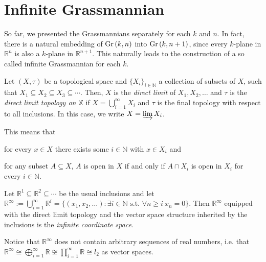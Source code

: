 \section{Infinite Grassmannian}
So far, we presented the Grassmannians separately for each $k$ and $n$. In fact, there is a natural embedding of $\Gr{k}{n}$ into $\Gr{k}{n+1}$, since every $k$-plane in $\mathbb{R}^n$ is also a $k$-plane in $\mathbb{R}^{n+1}$. This naturally leads to the construction of a so called infinite Grassmannian for each $k$.

\begin{definition} Let $(X,\tau)$ be a topological space and $\{X_i\}_{i\in\mathbb{N}}$ a collection of subsets of $X$, such that $X_1\subseteq X_2\subseteq X_3\subseteq\cdots$. Then, $X$ is the \emph{direct limit} of $X_1,X_2,\ldots$ and $\tau$ is the \emph{direct limit topology on $\mathbb{X}$} if $X=\bigcup_{i=1}^{\infty}X_i$ and $\tau$ is the final topology with respect to all inclusions. In this case, we write $X=\varinjlim X_i$.
\end{definition}
\begin{remark} This means that
\begin{b_item}
\item for every $x\in X$ there exists some $i\in\mathbb{N}$ with $x\in X_i$ and
\item for any subset $A\subseteq X$, $A$ is open in $X$ if and only if $A\cap X_i$ is open in $X_i$ for every $i\in\mathbb{N}$.
\end{b_item}
\end{remark}

\begin{definition} Let $\mathbb{R}^1\subseteq\mathbb{R}^2\subseteq\cdots$ be the usual inclusions and let $\mathbb{R}^{\infty}:=\bigcup_{i=1}^{\infty}\mathbb{R}^i=\big\{(x_1,x_2,\ldots):\exists i\in\mathbb{N}\text{ s.t. }\forall n\geq i\ x_n=0\big\}$. Then $\mathbb{R}^{\infty}$ equipped with the direct limit topology and the vector space structure inherited by the inclusions is the \emph{infinite coordinate space}.
\end{definition}
\begin{remark} Notice that $\mathbb{R}^{\infty}$ does not contain arbitrary sequences of real numbers, i.e. that $\mathbb{R}^{\infty}\cong\bigoplus_{i=1}^{\infty}\mathbb{R}\not\cong\prod_{i=1}^{\infty}\mathbb{R}\cong l_2$ as vector spaces.
\end{remark}

